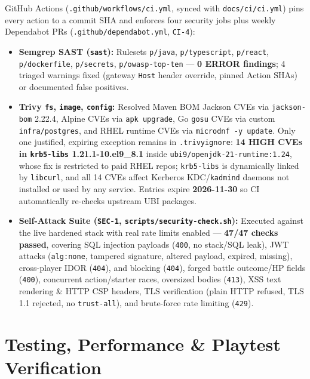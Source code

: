 \documentclass[10.5pt,a4paper]{article}
\DeclareRobustCommand{\code}[1]{\begingroup\def\_{\textunderscore\allowbreak}\texttt{#1}\endgroup}
\begin{document}
GitHub Actions (\code{.github/workflows/ci.yml}, synced with \code{docs/ci/ci.yml}) pins every action to a commit SHA and enforces four security jobs plus weekly Dependabot PRs (\code{.github/dependabot.yml}, \code{CI-4}):
\begin{itemize}
  \item \textbf{Semgrep SAST (\code{sast}):} Rulesets \code{p/java}, \code{p/typescript}, \code{p/react}, \code{p/dockerfile}, \code{p/secrets}, \code{p/owasp-top-ten} — \textbf{0 ERROR findings}; 4 triaged warnings fixed (gateway \code{Host} header override, pinned Action SHAs) or documented false positives.
  \item \textbf{Trivy \code{fs}, \code{image}, \code{config}:} Resolved Maven BOM Jackson CVEs via \code{jackson-bom} 2.22.4, Alpine CVEs via \code{apk upgrade}, Go \code{gosu} CVEs via custom \code{infra/postgres}, and RHEL runtime CVEs via \code{microdnf -y update}. Only one justified, expiring exception remains in \code{.trivyignore}: \textbf{14 HIGH CVEs in \code{krb5-libs} 1.21.1-10.el9\_8.1} inside \code{ubi9/openjdk-21-runtime:1.24}, whose fix is restricted to paid RHEL repos; \code{krb5-libs} is dynamically linked by \code{libcurl}, and all 14 CVEs affect Kerberos KDC/\code{kadmind} daemons not installed or used by any service. Entries expire \textbf{2026-11-30} so CI automatically re-checks upstream UBI packages.
  \item \textbf{Self-Attack Suite (\code{SEC-1}, \code{scripts/security-check.sh}):} Executed against the live hardened stack with real rate limits enabled — \textbf{47/47 checks passed}, covering SQL injection payloads (\code{400}, no stack/SQL leak), JWT attacks (\code{alg:none}, tampered signature, altered payload, expired, missing), cross-player IDOR (\code{404}),  and  blocking (\code{404}), forged battle outcome/HP fields (\code{400}), concurrent action/starter races, oversized bodies (\code{413}), XSS text rendering \& HTTP CSP headers, TLS verification (plain HTTP refused, TLS 1.1 rejected, no \code{trust-all}), and brute-force rate limiting (\code{429}).
\end{itemize}

\section{Testing, Performance \& Playtest Verification}
\label{sec:testing}
\end{document}
